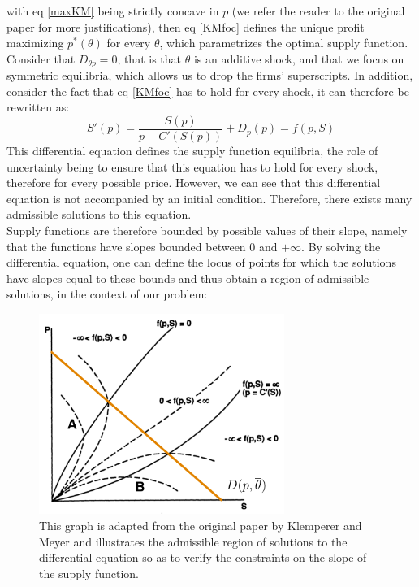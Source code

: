with eq \ref{maxKM} being strictly concave in $p$ (we refer the reader to the original paper for more justifications), then eq \ref{KMfoc} defines the unique profit maximizing $p^*(\theta)$ for every $\theta$, which parametrizes the optimal supply function. \\

Consider that $D_{\theta p }=0$, that is that $\theta$ is an additive shock, and that we focus on symmetric equilibria, which allows us to drop the firms' superscripts. In addition, consider the fact that eq \ref{KMfoc} has to hold for every shock, it can therefore be rewritten as:
\begin{equation}\label{KMdiff}
S'(p) = \frac{S(p)}{p-C'(S(p))} + D_p(p)= f(p,S)
\end{equation}
This differential equation defines the supply function equilibria, the role of uncertainty being to ensure that this equation has to hold for every shock, therefore for every possible price. However, we can see that this differential equation is not accompanied by an initial condition. Therefore, there exists many admissible solutions to this equation.\\

Supply functions are therefore bounded by possible values of their slope, namely that the functions have slopes bounded between $0$ and $+\infty$. By solving the differential equation, one can define the locus of points for which the solutions have slopes equal to these bounds and thus obtain a region of admissible solutions, in the context of our problem:

\begin{figure}[h]
\centering
\includegraphics[width=8cm]{figintro/KMboundaries.png}
\caption{\small{This graph is adapted from the original paper by Klemperer and Meyer and illustrates the admissible region of solutions to the differential equation so as to verify the constraints on the slope of the supply function.}}
\label{KMboundaries}
\end{figure}

